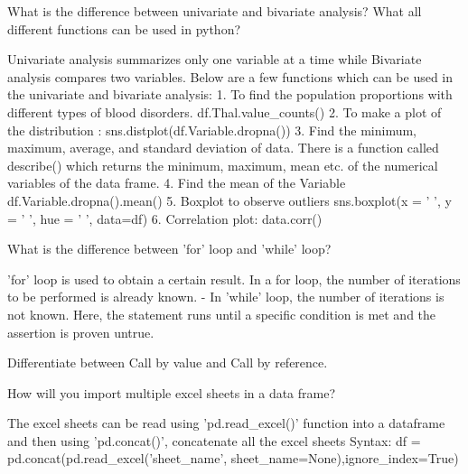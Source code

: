 	\begin{qanda}
		\begin{question}
What is the difference between univariate and bivariate analysis? What all different functions can be used in python?
		\end{question}
		\begin{answer}
Univariate analysis summarizes only one variable at a time while Bivariate analysis compares two variables. Below are a few functions which can be used in the univariate and bivariate analysis: 1. To find the population proportions with different types of blood disorders. df.Thal.value\_counts() 2. To make a plot of the distribution : sns.distplot(df.Variable.dropna()) 3. Find the minimum, maximum, average, and standard deviation of data. There is a function called describe() which returns the minimum, maximum, mean etc. of the numerical variables of the data frame. 4. Find the mean of the Variable df.Variable.dropna().mean() 5. Boxplot to observe outliers sns.boxplot(x = ' ', y = ' ', hue = ' ', data=df) 6. Correlation plot: data.corr()
		\end{answer}
	\end{qanda}

	\begin{qanda}
		\begin{question}
What is the difference between 'for' loop and 'while' loop?
		\end{question}
		\begin{answer}
'for' loop is used to obtain a certain result. In a for loop, the number of iterations to be performed is already known. - In 'while' loop, the number of iterations is not known. Here, the statement runs until a specific condition is met and the assertion is proven untrue.
		\end{answer}
	\end{qanda}

	\begin{qanda}
		\begin{question}
Differentiate between Call by value and Call by reference.
		\end{question}
		\begin{answer}
		\end{answer}
	\end{qanda}

	\begin{qanda}
		\begin{question}
How will you import multiple excel sheets in a data frame?
		\end{question}
		\begin{answer}
The excel sheets can be read using 'pd.read\_excel()' function into a dataframe and then using 'pd.concat()', concatenate all the excel sheets\newline{}
Syntax: df = pd.concat(pd.read\_excel('sheet\_name', sheet\_name=None),\newline{}\hspace*{48pt}ignore\_index=True)
		\end{answer}
	\end{qanda}

